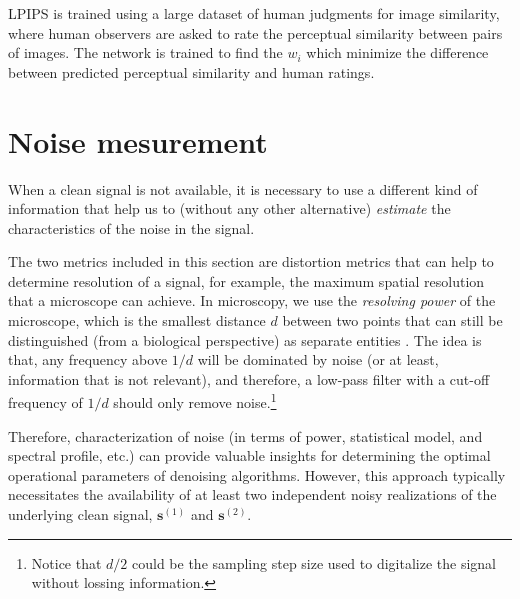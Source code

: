 \documentclass{article}
\begin{document}
LPIPS is trained using a large dataset of human judgments for image
similarity, where human observers are asked to rate the perceptual
similarity between pairs of images. The network is trained to find the
$w_i$ which minimize the difference between predicted perceptual
similarity and human ratings.



\section{Noise mesurement}

When a clean signal is not available, it is necessary to use a
different kind of information that help us to (without any other
alternative) \emph{estimate} the characteristics of the noise in the
signal.

The two metrics included in this section are distortion metrics that
can help to determine resolution of a signal, for example, the maximum
spatial resolution that a microscope can achieve. In microscopy, we
use the \emph{resolving power} of the microscope, which is the
smallest distance $d$ between two points that can still be
distinguished (from a biological perspective) as separate entities
\cite{nieuwenhuizen2013measuring}. The idea is that, any frequency
above $1/d$ will be dominated by noise (or at least, information that
is not relevant), and therefore, a low-pass filter with a cut-off
frequency of $1/d$ should only remove noise.\footnote{Notice that
  $d/2$ could be the sampling step size used to digitalize the signal
  without lossing information.}

Therefore, characterization of noise (in terms of power, statistical
model, and spectral profile, etc.) can provide valuable insights for
determining the optimal operational parameters of denoising
algorithms. However, this approach typically necessitates the
availability of at least two independent noisy realizations of the
underlying clean signal, $\mathbf{s}^{(1)}$ and
$\mathbf{s}^{(2)}$.

\end{document}
